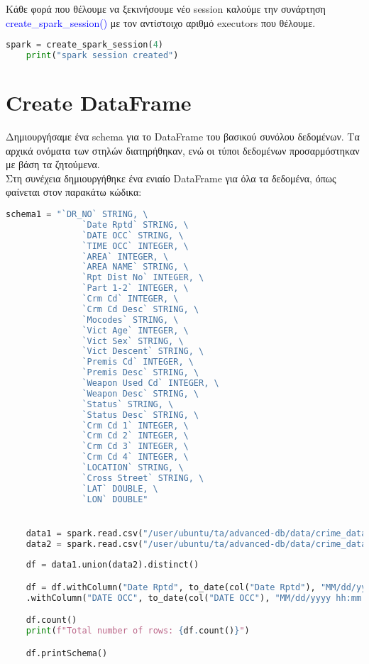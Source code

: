 \documentclass{article}
\begin{document}
Κάθε φορά που θέλουμε να ξεκινήσουμε νέο session καλούμε την συνάρτηση 
\textcolor{blue}{create\_spark\_session()} με τον αντίστοιχο αριθμό executors που θέλουμε.

\begin{lstlisting}[language = Python]
    spark = create_spark_session(4)
    print("spark session created")  
\end{lstlisting}

\section{Create DataFrame}

Δημιουργήσαμε ένα schema για το DataFrame του βασικού συνόλου δεδομένων. Τα αρχικά ονόματα των στηλών διατηρήθηκαν, ενώ οι τύποι δεδομένων προσαρμόστηκαν με βάση τα ζητούμενα. \\
Στη συνέχεια δημιουργήθηκε ένα ενιαίο DataFrame για όλα τα δεδομένα, όπως φαίνεται στον παρακάτω κώδικα: 

\begin{lstlisting}[language = Python]
    schema1 = "`DR_NO` STRING, \
               `Date Rptd` STRING, \
               `DATE OCC` STRING, \
               `TIME OCC` INTEGER, \
               `AREA` INTEGER, \
               `AREA NAME` STRING, \
               `Rpt Dist No` INTEGER, \
               `Part 1-2` INTEGER, \
               `Crm Cd` INTEGER, \
               `Crm Cd Desc` STRING, \
               `Mocodes` STRING, \
               `Vict Age` INTEGER, \
               `Vict Sex` STRING, \
               `Vict Descent` STRING, \
               `Premis Cd` INTEGER, \
               `Premis Desc` STRING, \
               `Weapon Used Cd` INTEGER, \
               `Weapon Desc` STRING, \
               `Status` STRING, \
               `Status Desc` STRING, \
               `Crm Cd 1` INTEGER, \
               `Crm Cd 2` INTEGER, \
               `Crm Cd 3` INTEGER, \
               `Crm Cd 4` INTEGER, \
               `LOCATION` STRING, \
               `Cross Street` STRING, \
               `LAT` DOUBLE, \
               `LON` DOUBLE"


    data1 = spark.read.csv("/user/ubuntu/ta/advanced-db/data/crime_data_2010.csv", header=True, schema=schema1)
    data2 = spark.read.csv("/user/ubuntu/ta/advanced-db/data/crime_data_2020.csv", header=True, schema=schema1)
    
    df = data1.union(data2).distinct()

    df = df.withColumn("Date Rptd", to_date(col("Date Rptd"), "MM/dd/yyyy hh:mm:ss a")) \
    .withColumn("DATE OCC", to_date(col("DATE OCC"), "MM/dd/yyyy hh:mm:ss a"))

    df.count()
    print(f"Total number of rows: {df.count()}")

    df.printSchema()
\end{lstlisting}
\end{document}
